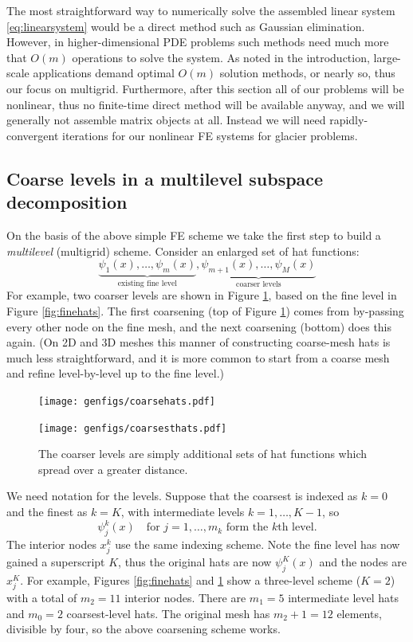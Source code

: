 \documentclass[letterpaper,final,12pt,reqno]{amsart}
\numberwithin{equation}{section}
\numberwithin{figure}{section}
\numberwithin{table}{section}
\begin{document}
The most straightforward way to numerically solve the assembled linear system \eqref{eq:linearsystem} would be a direct method such as Gaussian elimination.  However, in higher-dimensional PDE problems such methods need much more that $O(m)$ operations to solve the system.  As noted in the introduction, large-scale applications demand optimal $O(m)$ solution methods, or nearly so, thus our focus on multigrid.  Furthermore, after this section all of our problems will be nonlinear, thus no finite-time direct method will be available anyway, and we will generally not assemble matrix objects at all.  Instead we will need rapidly-convergent iterations for our nonlinear FE systems for glacier problems.

\subsection*{Coarse levels in a multilevel subspace decomposition}  On the basis of the above simple FE scheme we take the first step to build a \emph{multilevel} (multigrid) scheme.  Consider an enlarged set of hat functions:
    $$\underbrace{\psi_1(x),\dots,\psi_m(x)}_{\text{existing fine level}},\underbrace{\psi_{m+1}(x),\dots,\psi_M(x)}_{\text{coarser levels}}$$
For example, two coarser levels are shown in Figure \ref{fig:coarsehats}, based on the fine level in Figure \ref{fig:finehats}.  The first coarsening (top of Figure \ref{fig:coarsehats}) comes from by-passing every other node on the fine mesh, and the next coarsening (bottom) does this again.  (On 2D and 3D meshes this manner of constructing coarse-mesh hats is much less straightforward, and it is more common to start from a coarse mesh and refine level-by-level up to the fine level.)

\begin{figure}
\texttt{[image: genfigs/coarsehats.pdf]}
\smallskip

\texttt{[image: genfigs/coarsesthats.pdf]}
\caption{The coarser levels are simply additional sets of hat functions which spread over a greater distance.}
\label{fig:coarsehats}
\end{figure}

We need notation for the levels.  Suppose that the coarsest is indexed as $k=0$ and the finest as $k=K$, with intermediate levels $k=1,\dots,K-1$, so
\begin{equation}
  \psi_j^k(x) \quad \text{for } j=1,\dots,m_k \text{ form the $k$th level}.  \label{eq:definepsijk}
\end{equation}
The interior nodes $x_j^k$ use the same indexing scheme.  Note the fine level has now gained a superscript $K$, thus the original hats are now $\psi_j^K(x)$ and the nodes are $x_j^K$.  For example, Figures \ref{fig:finehats} and \ref{fig:coarsehats} show a three-level scheme ($K=2$) with a total of $m_2=11$ interior nodes.  There are $m_1=5$ intermediate level hats and $m_0=2$ coarsest-level hats.  The original mesh has $m_2+1=12$ elements, divisible by four, so the above coarsening scheme works.
\end{document}
